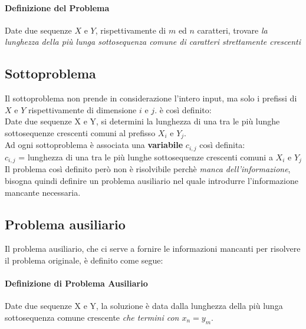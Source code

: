 \paragraph*{Definizione del Problema}
Date due sequenze $X$ e $Y$, rispettivamente di $m$ ed $n$ caratteri, trovare \emph{la lunghezza della più lunga sottosequenza comune di caratteri strettamente crescenti}

\subsection*{Sottoproblema}
Il sottoproblema non prende in considerazione l'intero input, ma solo i prefissi di $X$ e $Y$ rispettivamente di dimensione $i$ e $j$.
è così definito:
\\Date due sequenze X e Y, si determini la lunghezza di una tra le più lunghe sottosequenze crescenti comuni al prefisso $X_i$ e $Y_j$.
\\Ad ogni sottoproblema è associata una \textbf{variabile} $c_{i,j}$ così definita:
\\$c_{i,j}$ = lunghezza di una tra le più lunghe sottosequenze crescenti comuni a $X_i$ e $Y_j$
\\Il problema così definito però non è risolvibile perchè \emph{manca dell'informazione}, bisogna quindi definire un problema ausiliario nel quale introdurre l'informazione mancante necessaria.

\subsection*{Problema ausiliario}
Il problema ausiliario, che ci serve a fornire le informazioni mancanti per risolvere il problema originale, è definito come segue:

\paragraph*{Definizione di Problema Ausiliario}
Date due sequenze X e Y, la soluzione è data dalla lunghezza della più lunga sottosequenza comune crescente \emph{che termini con $x_n =y_m$}.


